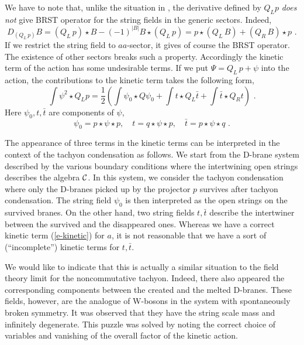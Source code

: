 \documentclass[a4paper,12pt]{article}
\begin{document}
We have to note that,
unlike the situation in \cite{r-HLRS}, the derivative defined by
$Q_L p$ {\em does not} give BRST operator for the
string fields in the generic sectors.  
Indeed,
\begin{equation}
 D_{(Q_L \, p)} B = (Q_L \, p)\star B - (-1)^{|B|} B\star (Q_L \, p)
 = p\star(Q_L\, B)+ (Q_R\, B)\star p\,\,.
\end{equation}
If we restrict  the string field to $aa$-sector,
it gives of course the BRST operator. The existence of
other sectors breaks such a property. 
Accordingly the kinetic term of the action has
some undesirable terms.  If we put $\Psi=Q_L\, p+\psi$
into the action,
the contributions to the kinetic term takes the following form,
\begin{equation}\label{e-kinetic}
 \int \psi^2\star Q_L p = \frac{1}{2}\left(\int \psi_0 \star Q\psi_0
+\int t \star Q_L  \bar t + \int \bar t \star Q_R t
\right)\,\,.
\end{equation}
Here $\psi_0,t,\bar t$ are components of $\psi$,
\begin{equation}
 \psi_0=p\star\psi\star p,\quad
 t=q\star \psi\star p,\quad
 \bar t= p\star \psi\star q\,\,.
\end{equation}

The appearance of three terms in the kinetic terms can be
interpreted in the context of the tachyon condensation
\cite{r-Sen, r-HKLM, r-Witten2}  as follows.
We start from the D-brane system described by the
various boundary conditions where the intertwining open strings
describes the algebra ${\cal C}$.  In this system, we consider the tachyon
condensation where only 
the D-branes picked up by the projector $p$ survives
after tachyon condensation.
The string field $\psi_0$ is then interpreted as the open strings
on the survived branes.  On the other hand,
two string fields $t,\bar t$ describe the intertwiner
between the survived and the disappeared ones.
Whereas we have a correct kinetic term  (\ref{e-kinetic})
for $a$, it is not reasonable that we have
a sort of (``incomplete'') kinetic terms for $t,\bar t$.

We would like to indicate that
this is actually a similar situation to
the field theory limit \cite{r-HKLM} for the noncommutative
tachyon.  Indeed, there also appeared the corresponding
components between the created and the melted D-branes.
These fields, however, are the analogue of W-bosons in the
system with spontaneously broken symmetry.
It was observed that they have the string scale
mass and infinitely degenerate. This puzzle was solved
\cite{r-GMS2,r-Seiberg, r-Sen2} by noting the correct choice
of variables and  vanishing of the overall factor of
the kinetic action.
\end{document}
